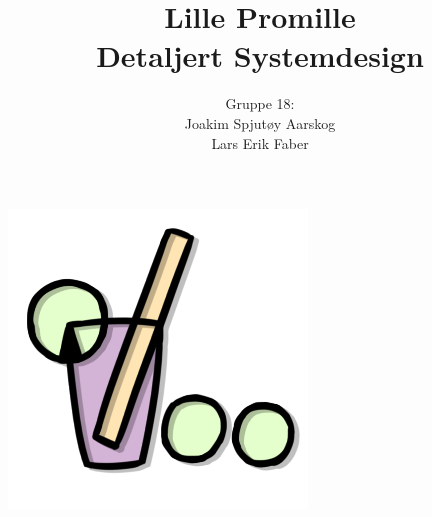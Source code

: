 \documentclass[12pt]{article}
\begin{document}
\title{%
    Lille Promille\\
    \large Detaljert Systemdesign}
\author{
    Gruppe 18:\\
    Joakim Spjutøy Aarskog\\
    Lars Erik Faber}
\date{}
\maketitle
\begin{center}
    \includegraphics[scale=3]{images/lille_promille_logo.png}    
\end{center}
\thispagestyle{empty}
\newpage
\tableofcontents
\thispagestyle{empty}
\newpage
\setcounter{page}{1}








\end{document}
